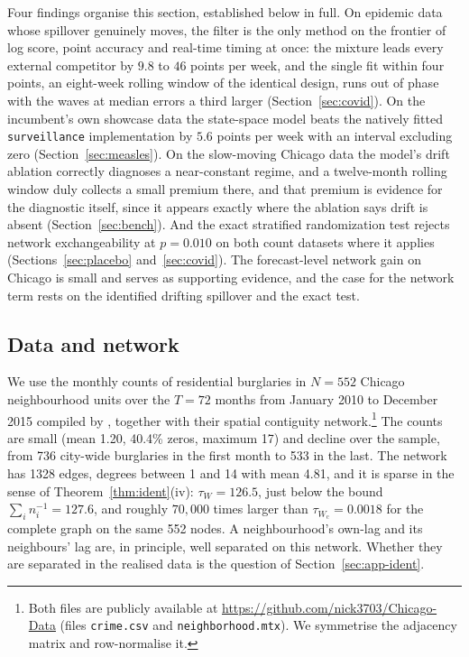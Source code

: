\documentclass[12pt]{article}
\theoremstyle{plain}
\theoremstyle{definition}
\theoremstyle{remark}
\newcommand{\Wc}{W_{\mathrm{c}}}
\newcommand{\tauW}{\tau_W}
\newcommand{\NumRegions}{552}
\newcommand{\NumMonths}{72}
\newcommand{\NumEdges}{1328}
\newcommand{\DegMean}{4.81}
\newcommand{\DegMax}{14}
\newcommand{\DegMin}{1}
\newcommand{\MeanCount}{1.20}
\newcommand{\ZeroFrac}{40.4}
\newcommand{\MaxCount}{17}
\newcommand{\TotalFirst}{736}
\newcommand{\TotalLast}{533}
\newcommand{\TauW}{126.5}
\newcommand{\TauWc}{0.0018}
\newcommand{\HarmonicSum}{127.6}
\begin{document}
Four findings organise this section, established below in full. On epidemic data whose spillover genuinely moves, the filter is the only method on the frontier of log score, point accuracy and real-time timing at once: the mixture leads every external competitor by $9.8$ to $46$ points per week, and the single fit within four points, an eight-week rolling window of the identical design, runs out of phase with the waves at median errors a third larger (Section~\ref{sec:covid}). On the incumbent's own showcase data the state-space model beats the natively fitted \texttt{surveillance} implementation by $5.6$ points per week with an interval excluding zero (Section~\ref{sec:measles}). On the slow-moving Chicago data the model's drift ablation correctly diagnoses a near-constant regime, and a twelve-month rolling window duly collects a small premium there, and that premium is evidence for the diagnostic itself, since it appears exactly where the ablation says drift is absent (Section~\ref{sec:bench}). And the exact stratified randomization test rejects network exchangeability at $p=0.010$ on both count datasets where it applies (Sections~\ref{sec:placebo} and~\ref{sec:covid}). The forecast-level network gain on Chicago is small and serves as supporting evidence, and the case for the network term rests on the identified drifting spillover and the exact test.



\subsection{Data and network}
We use the monthly counts of residential burglaries in $N=\NumRegions$ Chicago neighbourhood units over the $T=\NumMonths$ months from January 2010 to December 2015 compiled by \citet{clark2021class}, together with their spatial contiguity network.\footnote{Both files are publicly available at \url{https://github.com/nick3703/Chicago-Data} (files \texttt{crime.csv} and \texttt{neighborhood.mtx}). We symmetrise the adjacency matrix and row-normalise it.} The counts are small (mean \MeanCount, \ZeroFrac\% zeros, maximum \MaxCount{}) and decline over the sample, from \TotalFirst{} city-wide burglaries in the first month to \TotalLast{} in the last. The network has \NumEdges{} edges, degrees between \DegMin{} and \DegMax{} with mean \DegMean, and it is sparse in the sense of Theorem~\ref{thm:ident}(iv): $\tauW=\TauW$, just below the bound $\sum_i n_i^{-1}=\HarmonicSum$, and roughly $70{,}000$ times larger than $\tau_{\Wc}=\TauWc$ for the complete graph on the same \NumRegions{} nodes. A neighbourhood's own-lag and its neighbours' lag are, in principle, well separated on this network. Whether they are separated in the realised data is the question of Section~\ref{sec:app-ident}.
\end{document}
